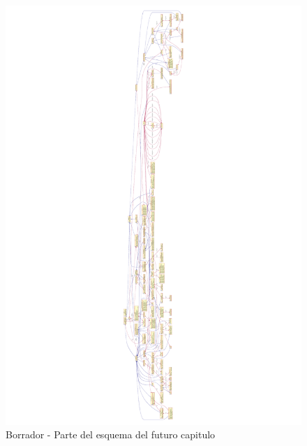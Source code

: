 \begin{figure}
  \includegraphics[width=1.0\textwidth]{appendices/JavaPrinting}
  \caption{Borrador - Parte del esquema del futuro capitulo }
  \label{fig:lan-networks-topologies-fig2}
\end{figure}
 
